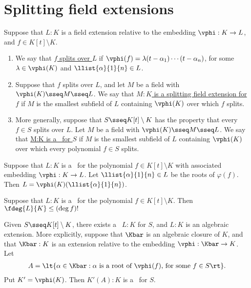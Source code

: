 \documentclass[a4paper]{article}
\begin{document}
\section{Splitting field extensions}
\begin{tdefinition}
  Suppose that \( L:K \) is a field extension relative to the embedding \( \vphi : K\to L \), and \( f\in K[t]\setminus K \). \begin{enumerate}[label=(\roman*)]
    \item We say that \ul{\( f \) splits over \( L \)} if \( \vphi(f)=\lambda(t-\alpha_1)\cdots(t-\alpha_n) \), for some \( \lambda\in \vphi(K) \) and \( \llist{\alpha}{1}{n}\in L \).
    \item Suppose that \( f \) splits over \( L \), and let \( M \) be a field with \( \vphi(K)\sseq M\sseq L \).
      We say that \ul{\( M:K \) is a splitting field extension for \( f \)} if \( M \) is the smallest subfield of \( L \) containing \( \vphi(K) \) over which \( f \) splits.
    \item More generally, suppose that \( S\sseq K[t]\setminus K \) has the property that every \( f\in S \) splits over \( L \).
      Let \( M \) be a field with \( \vphi(K)\sseq M\sseq L \).
      We say that \ul{M:K is a \sfe~for \( S \)} if \( M \) is the smallest subfield of \( L \) containing \( \vphi(K) \) over which every polynomial \( f\in S \) splits.
  \end{enumerate}
\end{tdefinition}

\begin{tproposition}
  Suppose that \( L:K \) is a \sfe~for the polynomial \( f\in K[t]\setminus K \) with associated embedding \( \vphi:K\to L \).
  Let \( \llist{\alpha}{1}{n}\in L \) be the roots of \( \varphi(f) \).
  Then \( L=\vphi(K)(\llist{\alpha}{1}{n}) \).
\end{tproposition}

\begin{tproposition}
  Suppose that \( L:K \) is a \sfe~for the polynomial \( f\in K[t]\setminus K \).
  Then \( \fdeg{L}{K}\leq (\deg f)! \)
\end{tproposition}

\begin{tproposition}
  Given \( S\sseq K[t]\setminus K \), there exists a \sfe~\( L:K \) for \( S \), and \( L:K \) is an algebraic extension.
  More explicitly, suppose that \( \Kbar \) is an algebraic closure of \( K \), and that \( \Kbar:K \) is an extension relative to the embedding \( \vphi:\Kbar\to K \). Let
  \begin{align*}
    A=\lt\{ \alpha\in \Kbar : \alpha\text{ is a root of \( \vphi(f) \), for some } f\in S \rt\}.
  \end{align*}
  Put \( K'=\vphi(K) \).
  Then \( K'(A):K \) is a \sfe~for \( S \).
\end{tproposition}
\end{document}
